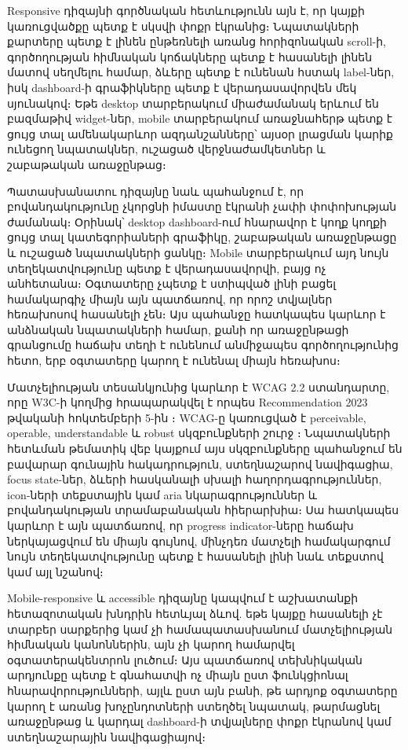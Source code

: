 Responsive դիզայնի գործնական հետևությունն այն է, որ կայքի կառուցվածքը պետք է սկսվի փոքր էկրանից։ Նպատակների քարտերը պետք է լինեն ընթեռնելի առանց հորիզոնական scroll-ի, գործողության հիմնական կոճակները պետք է հասանելի լինեն մատով սեղմելու համար, ձևերը պետք է ունենան հստակ label-ներ, իսկ dashboard-ի գրաֆիկները պետք է վերադասավորվեն մեկ սյունակով։ Եթե desktop տարբերակում միաժամանակ երևում են բազմաթիվ widget-ներ, mobile տարբերակում առաջնահերթ պետք է ցույց տալ ամենակարևոր ազդանշանները՝ այսօր լրացման կարիք ունեցող նպատակներ, ուշացած վերջնաժամկետներ և շաբաթական առաջընթաց։

Պատասխանատու դիզայնը նաև պահանջում է, որ բովանդակությունը չկորցնի իմաստը էկրանի չափի փոփոխության ժամանակ։ Օրինակ՝ desktop dashboard-ում հնարավոր է կողք կողքի ցույց տալ կատեգորիաների գրաֆիկը, շաբաթական առաջընթացը և ուշացած նպատակների ցանկը։ Mobile տարբերակում այդ նույն տեղեկատվությունը պետք է վերադասավորվի, բայց ոչ անհետանա։ Օգտատերը չպետք է ստիպված լինի բացել համակարգիչ միայն այն պատճառով, որ որոշ տվյալներ հեռախոսով հասանելի չեն։ Այս պահանջը հատկապես կարևոր է անձնական նպատակների համար, քանի որ առաջընթացի գրանցումը հաճախ տեղի է ունենում անմիջապես գործողությունից հետո, երբ օգտատերը կարող է ունենալ միայն հեռախոս։

Մատչելիության տեսանկյունից կարևոր է WCAG 2.2 ստանդարտը, որը W3C-ի կողմից հրապարակվել է որպես Recommendation 2023 թվականի հոկտեմբերի 5-ին \autocite{w3cWcag22News,w3cWcag22}։ WCAG-ը կառուցված է perceivable, operable, understandable և robust սկզբունքների շուրջ \autocite{w3cWcag22}։ Նպատակների հետևման թեմատիկ վեբ կայքում այս սկզբունքները պահանջում են բավարար գունային հակադրություն, ստեղնաշարով նավիգացիա, focus state-ներ, ձևերի հասկանալի սխալի հաղորդագրություններ, icon-ների տեքստային կամ aria նկարագրություններ և բովանդակության տրամաբանական հիերարխիա։ Սա հատկապես կարևոր է այն պատճառով, որ progress indicator-ները հաճախ ներկայացվում են միայն գույնով, մինչդեռ մատչելի համակարգում նույն տեղեկատվությունը պետք է հասանելի լինի նաև տեքստով կամ այլ նշանով։

Mobile-responsive և accessible դիզայնը կապվում է աշխատանքի հետազոտական խնդրին հետևյալ ձևով. եթե կայքը հասանելի չէ տարբեր սարքերից կամ չի համապատասխանում մատչելիության հիմնական կանոններին, այն չի կարող համարվել օգտատերակենտրոն լուծում։ Այս պատճառով տեխնիկական արդյունքը պետք է գնահատվի ոչ միայն ըստ ֆունկցիոնալ հնարավորությունների, այլև ըստ այն բանի, թե արդյոք օգտատերը կարող է առանց խոչընդոտների ստեղծել նպատակ, թարմացնել առաջընթաց և կարդալ dashboard-ի տվյալները փոքր էկրանով կամ ստեղնաշարային նավիգացիայով։

